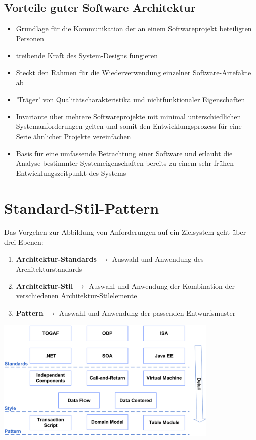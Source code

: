 \documentclass{report}
\newenvironment{Figure}
	{\par\medskip\noindent\minipage{\linewidth}}
	{\endminipage\par\medskip}
\theoremstyle{definition}
\theoremstyle{example}
\begin{document}
\subsection{Vorteile guter Software Architektur}
\begin{itemize}
	\item Grundlage für die Kommunikation der an einem Softwareprojekt beteiligten Personen
	\item treibende Kraft des System-Designs fungieren
	\item Steckt den Rahmen für die Wiederverwendung einzelner Software-Artefakte ab
	\item 'Träger' von Qualitätscharakteristika und nichtfunktionaler Eigenschaften
	\item Invariante über mehrere Softwareprojekte mit minimal unterschiedlichen Systemanforderungen gelten und somit den Entwicklungsprozess für eine Serie ähnlicher Projekte vereinfachen
	\item Basis für eine umfassende Betrachtung einer Software und erlaubt die Analyse bestimmter Systemeigenschaften bereits zu einem sehr frühen Entwicklungszeitpunkt des Systems
\end{itemize}

\section{Standard-Stil-Pattern}
Das Vorgehen zur Abbildung von Anforderungen auf ein Zielsystem geht über drei Ebenen:
\begin{enumerate}
	\item \textbf{Architektur-Standards} $\rightarrow$ Auswahl und Anwendung des Architekturstandards
	\item \textbf{Architektur-Stil} $\rightarrow$ Auswahl und Anwendung der Kombination der verschiedenen Architektur-Stilelemente
	\item \textbf{Pattern} $\rightarrow$ Auswahl und Anwendung der passenden Entwurfsmuster
\end{enumerate}

\begin{Figure}
\centering
\includegraphics[width=400px]{img/StandardStilPattern.png}
	\label{fig:Standard Stil Pattern}
\end{Figure}
\end{document}
